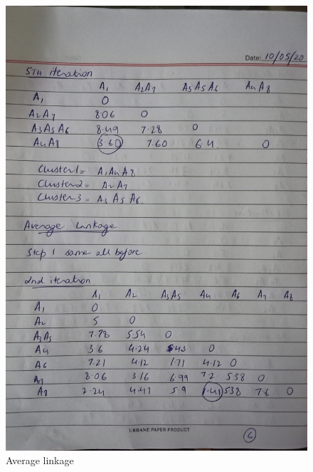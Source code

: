 \documentclass[12pt]{article}
\begin{document}
\begin{figure}
  \includegraphics[width=\linewidth]{6.jpg}
  \caption{Average linkage}
  \label{pic6}
\end{figure}
\end{document}
